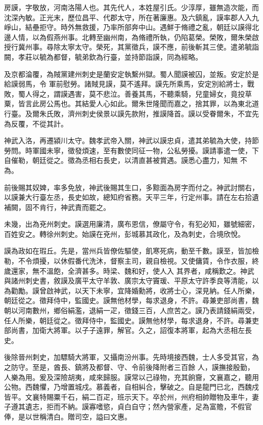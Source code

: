 \begin{pinyinscope}
 房謨，字敬放，河南洛陽人也。其先代人，本姓屋引氏。少淳厚，雖無造次能，而沈深內敏。正光末，歷位昌平、代郡太守，所在著廉惠。及六鎮亂，謨率郡人入九崢山，結壘拒守。時外無救援，乃率所部奔中山。遇鮮于脩禮之亂，朝廷以謨得北邊人情，以為假燕州事。北轉至幽州南，為脩禮所執，仍陷葛榮。榮敗，爾朱榮啟授行冀州事。尋除太寧太守。榮死，其黨徵兵，謨不應，前後斬其三使。遣弟毓詣闕，孝莊以毓為都督，毓弟欽為行臺，並持節詣謨，同為經略。



 及京都淪覆，為賊黨建州刺史是蘭安定執繫州獄。蜀人聞謨被囚，並叛。安定於是給謨弱馬，令
 軍前慰勞。諸賊見謨，莫不遙拜。謨先所乘馬，安定別給將士，戰敗，蜀人得之，謂謨遇害，莫不悲泣。善養其馬，不聽乘騎，兒童婦女，竟投草粟，皆言此房公馬也。其結愛人心如此。爾朱世隆聞而嘉之，捨其罪，以為東北道行臺。及爾朱氏敗，濟州刺史侯景以謨先款附，推謨降首。謨以受眷爾朱，不宜先為反覆，不從其計。



 神武入洛，再遷潁川太守。魏孝武帝入關，神武以謨忠貞，遣其弟毓為大使，持節勞問。時軍國未寧，徵發煩速，至有數使同征一物，公私勞擾。謨請事遣一使，下自催勒，朝廷從之。徵為丞相右長史，以清直甚被賞遇。謨悉心盡力，知無
 不為。



 前後賜其奴婢，率多免放，神武後賜其生口，多黥面為房字而付之。神武討關右，以謨兼大行臺左丞，長史如故，總知府省務。天平三年，行定州事。請在左右拾遺補闕，固不肯行，神武責而罷之。



 未幾，出為兗州刺史。謨選用廉清，廣布恩信，僚屬守令，有犯必知，雖號細密，百姓安之。轉徐州刺史。始謨在兗州，彭城慕其政化，及為刺史，合境欣悅。



 謨為政如在瑕丘。先是，當州兵皆僚佐驅使，飢寒死病，動至千數。謨至，皆加檢勒，不令煩擾，以休假番代洗沐，督察主司，親自檢視。又使傭賃，令作衣服，終歲還家，無不溫飽，全濟甚多。時梁、魏和好，使人入
 其界者，咸稱歎之。神武與諸州刺史書，敘謨及廣平太守羊敦、廣宗太守竇瑗、平原太守許季良等清能，以為勸勵。謨曾啟神武，以天下未寧，宜降婚勳將，收將士心，深見納。任人所樂，朝廷從之。徵拜侍中，監國史。謨無他材學，每求退身，不許。尋兼吏部尚書，魏朝以河南數州，鄉俗絹濫，退絹一疋，徵錢三百，人庶苦之。謨乃表請錢絹兩受，任人所樂，朝廷從之。徵拜侍中，監國史。謨無他材學，每求退身，不許。尋兼吏部尚書，加衛大將軍。以子子遠罪，解官。久之，詔復本將軍，起為大丞相左長史。



 後除晉州刺史，加驃騎大將軍，又攝南汾州事。先時境接西魏，士人多受其官，為之防守。至是，酋長、鎮將及都督、守、令前後降附者三百餘
 人，謨撫接殷勤，人樂為用。爰及深險胡夷，咸來歸服。謨常以己祿物，充其餉齎，文襄嘉之，聽用公物。西魏懼，乃增置城戍。慕義者，自相糾合，擊破之。自是龍門已北，西魏戍皆平。文襄特賜粟千石，絹二百疋，班示天下。卒於州，州府相帥贈物及車牛，妻子遵其遺志，拒而不納。謨寡嗜慾，貞白自守；然內營家產，足為富贍，不假官俸，是以世稱清白。贈司空，謚曰文惠。




\end{pinyinscope}
